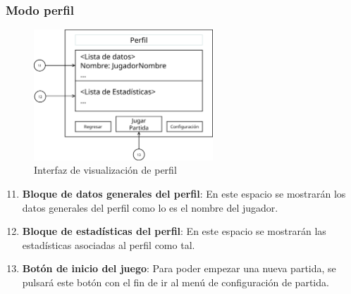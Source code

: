 \subsubsection{Modo perfil}
\begin{figure}[H]
    \centering
    \includegraphics[width=0.6\textwidth]{5-Cuerpo/Chapter5/5.5/I3.png} %
    \caption{Interfaz de visualización de perfil}
    \label{fig:Interface_Perfil}
\end{figure}
\begin{enumerate}\setcounter{enumi}{10}
    \item \textbf{Bloque de datos generales del perfil}: En este espacio se
    mostrarán los datos generales del perfil como lo es el nombre del jugador.
    \item \textbf{Bloque de estadísticas del perfil}: En este espacio se
    mostrarán las estadísticas asociadas al perfil como tal.
    \item \textbf{Botón de inicio del juego}: Para poder empezar una nueva
    partida, se pulsará este botón con el fin de ir al menú de configuración de
    partida.
\end{enumerate}

